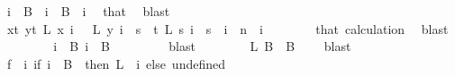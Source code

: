 \begin{isabellebody}
\ {\isacharasterisk}{\kern0pt}{\isacharcolon}{\kern0pt}{\isachardoublequoteopen}i\ {\isasymnotin}\ {\isacharquery}{\kern0pt}B{}{\isachardoublequoteclose}\ \ {\isachardoublequoteopen}i\ {\isasymin}\ {\isacharquery}{\kern0pt}B{}{\isachardoublequoteclose}\ \ i\ \isamarkupfalse%
\ that\ \isamarkupfalse%
\ blast\isanewline
\ \ \isacommand{{\isacharbraceright}{\kern0pt}}\isamarkupfalse%
\isanewline
\ \ \isamarkupfalse%
\isanewline
\ \ \isacommand{{\isacharbraceleft}{\kern0pt}}\isamarkupfalse%
\isanewline
\ \ \ \ \isamarkupfalse%
\ {\isachardoublequoteopen}{\isacharparenleft}{\kern0pt}{\isasymforall}x{\isacharless}{\kern0pt}t{\isachardot}{\kern0pt}\ {\isasymforall}y{\isacharless}{\kern0pt}t{\isachardot}{\kern0pt}\ L\ x\ i\ {\isacharequal}{\kern0pt}\ \ L\ y\ i{\isacharparenright}{\kern0pt}\ {\isasymlongrightarrow}\ {\isasymnot}{\isacharparenleft}{\kern0pt}{\isasymforall}s\ {\isacharless}{\kern0pt}\ t{\isachardot}{\kern0pt}\ L\ s\ i\ {\isacharequal}{\kern0pt}\ s{\isacharparenright}{\kern0pt}{\isachardoublequoteclose}\ \ {\isachardoublequoteopen}i\ {\isacharless}{\kern0pt}\ n{\isachardoublequoteclose}\ \ i\isanewline
\ \ \ \ \ \ \isamarkupfalse%
\ that\ calculation\ \isamarkupfalse%
\ blast\isanewline
\ \ \ \ \isamarkupfalse%
\ \isamarkupfalse%
\ {\isacharasterisk}{\kern0pt}{\isacharasterisk}{\kern0pt}{\isacharcolon}{\kern0pt}\ {\isachardoublequoteopen}{\isasymforall}i\ {\isasymin}\ {\isacharquery}{\kern0pt}B{}{\isachardot}{\kern0pt}\ i\ {\isasymnotin}\ {\isacharquery}{\kern0pt}B{}{\isachardoublequoteclose}\ \isanewline
\ \ \ \ \ \ \isamarkupfalse%
\ blast\isanewline
\ \ \isacommand{{\isacharbraceright}{\kern0pt}}\isamarkupfalse%
\isanewline
\ \ \isamarkupfalse%
\ \isamarkupfalse%
\ L{}{\isacharcolon}{\kern0pt}\ {\isachardoublequoteopen}{\isacharquery}{\kern0pt}B{}\ {\isasyminter}\ {\isacharquery}{\kern0pt}B{}\ {\isacharequal}{\kern0pt}\ {\isacharbraceleft}{\kern0pt}{\isacharbraceright}{\kern0pt}{\isachardoublequoteclose}\ \isamarkupfalse%
\ blast\isanewline
\isanewline
\ \ \isamarkupfalse%
\ {\isacharquery}{\kern0pt}f\ {\isacharequal}{\kern0pt}\ {\isachardoublequoteopen}{\isacharparenleft}{\kern0pt}{\isasymlambda}i{\isachardot}{\kern0pt}\ if\ i\ {\isasymin}\ B\ {}\ then\ L\ {}\ i\ else\ undefined{\isacharparenright}{\kern0pt}{\isachardoublequoteclose}\isanewline

\end{isabellebody}
